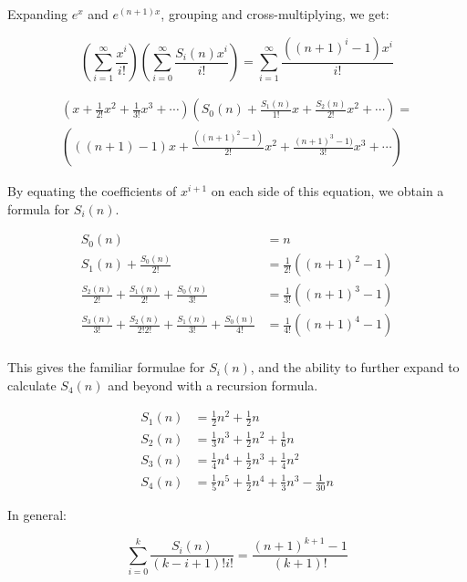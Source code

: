 \documentclass{article}
\begin{document}
Expanding $e^x$ and $e^{(n+1)x}$, grouping and cross-multiplying, we get:

\[ \left( \sum_{i=1}^{\infty} \frac{x^i}{i!} \right) 
	\left( \sum_{i=0}^{\infty} \frac{S_i(n)x^i}{i!}\right) = 
	\sum_{i=1}^{\infty} \frac{((n+1)^i - 1)x^i}{i!} \]

\begin{multline*}
	\left( x+\frac{1}{2!}x^2 + \frac{1}{3!}x^3 + \cdots \right)
	\left( S_0(n) + \frac{S_1(n)}{1!}x + \frac{S_2(n)}{2!}x^2 + \cdots \right) = \\
	\left( ((n+1) - 1)x+\frac{((n+1)^2-1)}{2!}x^2 + \frac{(n+1)^3-1)}{3!}x^3 + \cdots \right)
\end{multline*}

By equating the coefficients of $x^{i+1}$ on each side of this equation, we obtain a formula
for $S_i(n)$.

\begin{align*}
	S_0(n) &= n \\
	S_1(n) + \frac{S_0(n)}{2!} &= \frac{1}{2!}((n+1)^2 -1) \\
	\frac{S_2(n)}{2!} + \frac{S_1(n)}{2!} + \frac{S_0(n)}{3!} 
	&= \frac{1}{3!}\left( (n+1)^3 - 1 \right) \\
	\frac{S_3(n)}{3!} + \frac{S_2(n)}{2!2!} + \frac{S_1(n)}{3!} + \frac{S_0(n)}{4!} 
	&= \frac{1}{4!}\left( (n+1)^4 - 1 \right) \\
\end{align*}

This gives the familiar formulae for $S_i(n)$, and the ability to further expand to
calculate $S_4(n)$ and beyond with a recursion formula.

\begin{align*}
	S_1(n) &= \frac{1}{2}n^2 + \frac{1}{2}n \\
	S_2(n) &= \frac{1}{3}n^3 + \frac{1}{2}n^2 + \frac{1}{6}n \\
	S_3(n) &= \frac{1}{4}n^4 + \frac{1}{2}n^3 + \frac{1}{4}n^2 \\
	S_4(n) &= \frac{1}{5}n^5 + \frac{1}{2}n^4 + \frac{1}{3}n^3 - \frac{1}{30}n 
\end{align*}

In general:

\[ \sum_{i=0}^{k} \frac{S_i(n)}{(k - i + 1)!i!} = \frac{(n+1)^{k+1} - 1}{(k+1)!} \]
\end{document}
